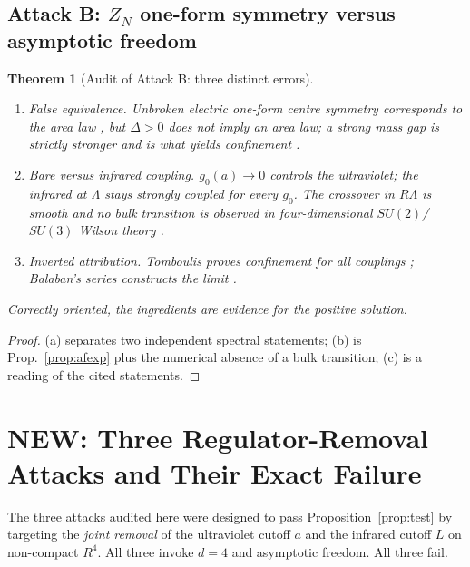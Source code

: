 \documentclass[11pt,a4paper]{article}
\def\R{R}\def\N{N}\def\Q{Q}\def\Z{Z}\def\Class{C}\def\OS{OS}\def\Gap{Gap}%
\theoremstyle{plain}
\newtheorem{theorem}{Theorem}[section]
\theoremstyle{definition}
\theoremstyle{remark}
\newcommand{\R}{\mathbb{R}}\newcommand{\N}{\mathbb{N}}\newcommand{\Q}{\mathbb{Q}}
\newcommand{\Z}{\mathbb{Z}}\newcommand{\Spec}{\operatorname{Spec}}
\newcommand{\OS}{\mathrm{OS}}\newcommand{\Gap}{\mathrm{Gap}}
\newcommand{\Class}{\mathcal{C}}\newcommand{\Htot}{\mathcal{H}}
\renewcommand{\_}{\oldunderscore\allowbreak}
\begin{document}
\subsection{Attack B: \texorpdfstring{$\Z_N$}{Z\_N} one-form symmetry versus asymptotic freedom}
\begin{theorem}[Audit of Attack B: three distinct errors]\label{thm:attackB}
\begin{enumerate}[label=(\alph*),leftmargin=22pt,itemsep=2pt]
\item \emph{False equivalence.} Unbroken electric one-form centre symmetry corresponds to the
area law \cite{GKSW2015}, but $\Delta>0$ does not imply an area law; a \emph{strong} mass gap is
strictly stronger and is what yields confinement \cite{ChatterjeeNotes,ChatterjeeMechanism}.
\item \emph{Bare versus infrared coupling.} $g_0(a)\to0$ controls the ultraviolet; the infrared
at $\Lambda$ stays strongly coupled for every $g_0$. The crossover in $R\Lambda$ is smooth and
no bulk transition is observed in four-dimensional $SU(2)$/$SU(3)$ Wilson theory
\cite{Greensite2003,ChatterjeeNotes}.
\item \emph{Inverted attribution.} Tomboulis proves confinement \emph{for all couplings}
\cite{Tomboulis1983,Tomboulis2007}; Balaban's series constructs the limit \cite{Balaban1987}.
\end{enumerate}
Correctly oriented, the ingredients are evidence \emph{for} the positive solution.
\end{theorem}
\begin{proof}
(a) separates two independent spectral statements; (b) is Prop.~\ref{prop:afexp} plus the
numerical absence of a bulk transition; (c) is a reading of the cited statements.
\end{proof}
\section{NEW: Three Regulator-Removal Attacks and Their Exact Failure}\label{sec:regulator}
The three attacks audited here were designed to pass Proposition~\ref{prop:test} by targeting
the \emph{joint removal} of the ultraviolet cutoff $a$ and the infrared cutoff $L$ on
non-compact $\R^4$. All three invoke $d=4$ and asymptotic freedom. All three fail.
\end{document}

